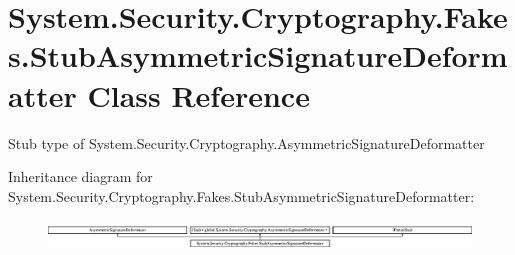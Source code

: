 \hypertarget{class_system_1_1_security_1_1_cryptography_1_1_fakes_1_1_stub_asymmetric_signature_deformatter}{\section{System.\-Security.\-Cryptography.\-Fakes.\-Stub\-Asymmetric\-Signature\-Deformatter Class Reference}
\label{class_system_1_1_security_1_1_cryptography_1_1_fakes_1_1_stub_asymmetric_signature_deformatter}
}


Stub type of System.\-Security.\-Cryptography.\-Asymmetric\-Signature\-Deformatter 


Inheritance diagram for System.\-Security.\-Cryptography.\-Fakes.\-Stub\-Asymmetric\-Signature\-Deformatter\-:\begin{figure}[H]
\begin{center}
\leavevmode
\includegraphics[height=0.790960cm]{class_system_1_1_security_1_1_cryptography_1_1_fakes_1_1_stub_asymmetric_signature_deformatter}
\end{center}
\end{figure}
